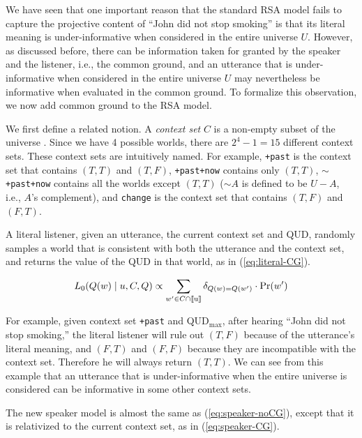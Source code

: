 We have seen that one important reason that the standard RSA model fails to 
 capture the projective content of ``John did not stop smoking'' is that its literal
 meaning is under-informative when considered in the entire universe $U$.
However, as discussed before, there can be information taken for granted by the
 speaker and the listener, i.e., the common ground, 
and an utterance that is under-informative when considered in the entire universe $U$ may 
 nevertheless be informative when evaluated in the common ground.
To formalize this observation, we now add common ground to the RSA model.

We first define a related notion. 
A \emph{context set} $C$ is a non-empty subset of the universe \cite{Stalnaker1974:Pragmatic-Presuppositions}.
Since we have 4 possible worlds, there are $2^4-1=15$ different context sets.
These context sets are intuitively named. 
For example, \verb=+past= is the context set
 that contains $(T, T)$ and $(T, F)$,
\verb=+past+now= contains only $(T, T)$,
$\sim$\verb=+past+now= contains all the worlds except $(T, T)$ ($\sim A$ is defined to be $U-A$, i.e., $A$'s complement), 
and \verb=change= is the context set that contains $(T, F)$ 
 and $(F, T)$.

A literal listener, given an utterance, the current context set and QUD, 
 randomly samples a world that is consistent with both the utterance and 
 the context set, and returns the value of the QUD in that world, as in  
 (\ref{eq:literal-CG}).

\vspace{-3ex}
\begin{equation}
L_0(Q(w) \mid u, C, Q) \propto  \sum_{w'\in C\cap \llbracket \text{u} \rrbracket} \delta_{Q(w)=Q(w')} \cdot \Pr(w') \label{eq:literal-CG}
\end{equation}

For example, given context set \verb=+past= and QUD$_\text{max}$, 
 after hearing ``John did not stop smoking,'' the literal listener will rule out 
 $(T, F)$ because of the utterance's literal meaning, and 
 $(F, T)$ and $(F, F)$ because 
 they are incompatible with the context set.
Therefore he will always return $(T, T)$.
We can see from this example that an utterance that is under-informative 
 when the entire universe is considered can be informative in some other 
 context sets.

The new speaker model is almost the same as (\ref{eq:speaker-noCG}), except that 
 it is relativized to the current context set, as in (\ref{eq:speaker-CG}).

